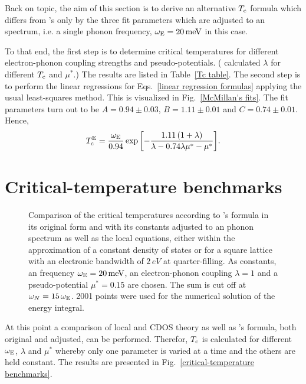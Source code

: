 Back on topic, the aim of this section is to derive an alternative $T \sb{\text{c}}$
formula which differs from 's only by the three fit parameters
which are adjusted to an  spectrum, i.e. a single phonon
frequency, $\omega \sb{\text{E}} = 20 \, \mathrm{meV}$ in this case.

To that end, the first step is to determine critical temperatures for different
electron-phonon coupling strengths and  pseudo-potentials.
( calculated $\lambda$ for different $T \sb{\text{c}}$ and $\mu^*$.) The
results are listed in Table~\ref{Tc table}. The second step is to perform the
linear regressions for Eqs.~\ref{linear regression formulas} applying the usual
least-squares method. This is visualized in Fig.~\ref{McMillan's fits}. The fit
parameters turn out to be $A = 0.94 \pm 0.03$, $B = 1.11 \pm 0.01$ and $C = 0.74
\pm 0.01$. Hence,
%
\begin{equation*}
    T \sb{\text{c}} \sp{\text{E}} = \frac{\omega \sb{\text{E}}}{0.94} \exp \bigg[ {-\frac
        {1.11 \, (1 + \lambda)}
        {\lambda - 0.74 \lambda \mu^* - \mu^*}}
    \bigg].
\end{equation*}

\section{Critical-temperature benchmarks}

\begin{figure}
    \small
    
    
    
    
    \caption[Critical-temperature benchmarks]{
        Comparison of the critical temperatures according to 's
        formula in its original form and with its constants adjusted to an
         phonon spectrum as well as the local 
        equations, either within the approximation of a constant density of
        states or for a square lattice with an electronic bandwidth of $2 \,
        \unit{eV}$ at quarter-filling. As constants, an 
        frequency $\omega \sb{\text{E}} = 20 \, \mathrm{meV}$, an electron-phonon
        coupling $\lambda = 1$ and a  pseudo-potential $\mu^* =
        0.15$ are chosen. The  sum is cut off at $\omega_N = 15
        \, \omega \sb{\text{E}}$. 2001 points were used for the numerical solution of
        the energy integral.}
    \label{critical-temperature benchmarks}
\end{figure}
%
At this point a comparison of local and CDOS  theory as well as
's formula, both original and adjusted, can be performed.
Therefor, $T \sb{\text{c}}$ is calculated for different $\omega \sb{\text{E}}$, $\lambda$ and
$\mu^*$ whereby only one parameter is varied at a time and the others are held
constant. The results are presented in Fig.~\ref{critical-temperature
benchmarks}.

